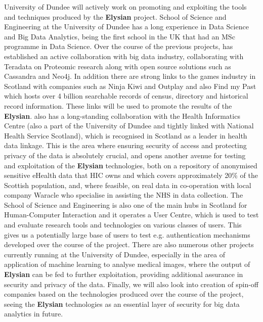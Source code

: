 \documentclass[a4paper,11pt]{article}
\newcommand{\project}[1]{\textbf{#1}\xspace}
\newcommand{\SECURITY}{\project{Elysian}}
\newcommand{\TheProject}{\SECURITY}
\begin{document}
University of Dundee will actively work on promoting and exploiting the tools and techniques produced by the \TheProject{} project. School of Science and Engineering at the University of Dundee has a long experience in Data Science and Big Data Analytics, being the first school in the UK that had an MSc programme in Data Science. Over the course of the previous projects, \UOD has established an active collaboration with big data industry, collaborating with Teradata  on Proteomic research along with open source solutions such as Cassandra and Neo4j. In addition there are strong links to the games industry in Scotland with companies such as Ninja Kiwi and Outplay and also Find my Past which hosts over 4 billion searchable records of census, directory and historical record information. These links will be used to promote the results of the \TheProject{}. \UOD also has a long-standing collaboration with the Health Informatics Centre (also a part of the University of Dundee and tightly linked with National Health Service Scotland), which is recognised in Scotland as a leader in health data linkage. This is the area where ensuring security of access and protecting privacy of the data is absolutely crucial, and opens another avenue for testing and exploitation of the \TheProject{} technologies, both on a repository of anonymised sensitive eHealth data that HIC owns and which covers approximately 20\% of the Scottish population, and, where feasible, on real data in co-operation with local company Waracle who specialise in assisting the NHS in data collection. The School of Science and Engineering is also one of the main hubs in Scotland for Human-Computer Interaction and it operates a User Centre, which is used to test and evaluate research tools and technologies on various classes of users. This gives us a potentially large base of users to test e.g. authentication mechanisms developed over the course of the project. There are also numerous other projects currently running at the University of Dundee, especially in the area of application of machine learning to analyse medical images, where the output of \TheProject{} can be fed to further exploitation, providing additional assurance in security and privacy of the data. Finally, we will also look into creation of spin-off companies based on the technologies produced over the course of the project, seeing the \TheProject{} technologies as an essential layer of security for big data analytics in future.
\end{document}
